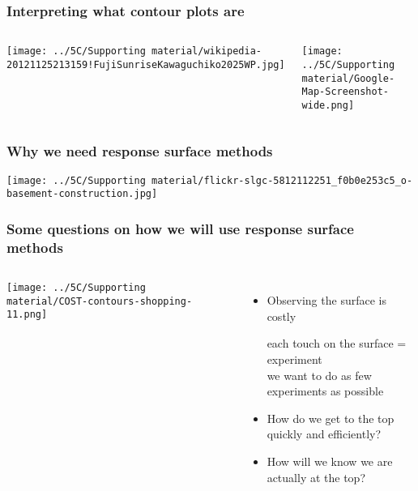 \begin{frame}\frametitle{Interpreting what contour plots are}
	\begin{columns}[b]
			\centerline{\texttt{[image: ../5C/Supporting material/wikipedia-20121125213159!FujiSunriseKawaguchiko2025WP.jpg]}}
			
		
			\centerline{\texttt{[image: ../5C/Supporting material/Google-Map-Screenshot-wide.png]}}

	\end{columns}
	
\end{frame}

\begin{frame}\frametitle{Why we need response surface methods}
	\centerline{\texttt{[image: ../5C/Supporting material/flickr-slgc-5812112251\_f0b0e253c5\_o-basement-construction.jpg]}}
\end{frame}

\begin{frame}\frametitle{Some questions on how we will use response surface methods }
	\begin{columns}[c]
			\centerline{\texttt{[image: ../5C/Supporting material/COST-contours-shopping-11.png]}}

			\begin{itemize}
				\item	Observing the surface is costly
						
						\hspace{1ex} {\scriptsize each touch on the surface = experiment }\\
						\hspace{1ex} {\scriptsize we want to do as few experiments as possible }
				\pause
				\item	How do we get to the top quickly and efficiently?
				
				\pause
				\item	How will we know we are actually at the top?
			\end{itemize}
	\end{columns}
	
\end{frame}

